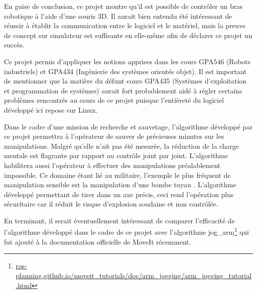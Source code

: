 \begin{conclusion}
En guise de conclusion, ce projet montre qu'il est possible de contrôler un bras robotique à l'aide d'une souris 3D.
Il aurait bien entendu été intéressant de réussir à établir la communication entre le logiciel et le matériel, mais la preuve de concept sur simulateur est suffisante en elle-même afin de déclarer ce projet un succès. 

Ce projet permis d'appliquer les notions apprises dans les cours GPA546 (Robots industriels) et GPA434 (Ingénierie des systèmes orientés objet). Il est important de mentionner que la matière du défunt cours GPA435 (Systèmes d'exploitation et programmation de systèmes) aurait fort probablement aidé à régler certains problèmes rencontrés au cours de ce projet puisque l'entièreté du logiciel développé ici repose sur Linux.

Dans le cadre d'une mission de recherche et sauvetage, l'algorithme développé par ce projet permettra à l'opérateur de sauver de précieuses minutes sur les manipulations. Malgré qu'elle n'ait pas été mesurée, la réduction de la charge mentale est flagrante par rapport au contrôle joint par joint. L'algorithme habilitera aussi l'opérateur à effectuer des manipulations préalablement impossible. Ce domaine étant lié au militaire, l'exemple le plus fréquent de manipulation sensible est la manipulation d'une bombe tuyau%
. L'algorithme développé permettant de tirer dans un axe précis, ceci rend l'opération plus sécuritaire car il réduit le risque d'explosion soudaine et non contrôlée. 

En terminant, il serait éventuellement intéressant de comparer l'efficacité de l'algorithme développé dans le cadre de ce projet avec l'algorithme jog\_arm\footnote{\href{https://ros-planning.github.io/moveit_tutorials/doc/arm_jogging/arm_jogging_tutorial.html}{ros-planning.github.io/moveit\_tutorials/doc/arm\_jogging/arm\_jogging\_tutorial.html}} qui fut ajouté à la documentation officielle de MoveIt récemment.
\end{conclusion}